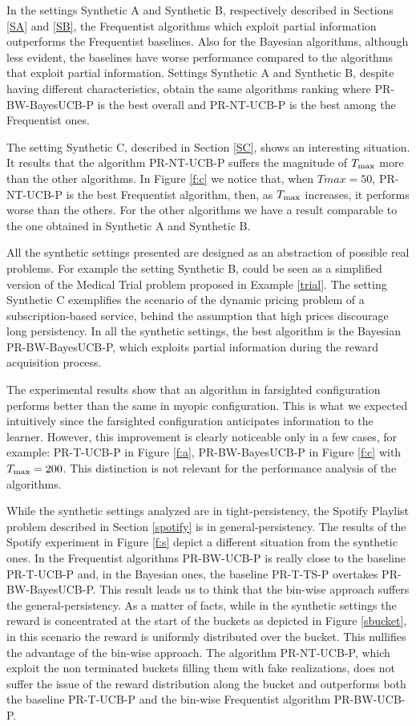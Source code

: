 In the settings Synthetic A and Synthetic B, respectively described in Sections \ref{SA} and \ref{SB}, the Frequentist algorithms which exploit partial information outperforms the Frequentist baselines. Also for the Bayesian algorithms, although less evident, the baselines have worse performance compared to the algorithms that exploit partial information. Settings Synthetic A and Synthetic B, despite having different characteristics, obtain the same algorithms ranking where PR-BW-BayesUCB-P is the best overall and PR-NT-UCB-P is the best among the Frequentist ones. 

The setting Synthetic C, described in Section \ref{SC}, shows an interesting situation. It results that the algorithm PR-NT-UCB-P suffers the magnitude of $T_{\textnormal{max}}$ more than the other algorithms. In Figure \ref{f:c} we notice that, when $Tmax=50$, PR-NT-UCB-P is the best Frequentist algorithm, then, as $T_{\textnormal{max}}$ increases, it performs worse than the others. For the other algorithms we have a result comparable to the one obtained in Synthetic A and Synthetic B.

All the synthetic settings presented are designed as an abstraction of possible real problems. For example the setting Synthetic B, could be seen as a simplified version of the Medical Trial problem proposed in Example \ref{trial}. The setting Synthetic C exemplifies the scenario of the dynamic pricing problem of a subscription-based service, behind the assumption that high prices discourage long persistency. In all the synthetic settings,  the best algorithm is the Bayesian PR-BW-BayesUCB-P, which exploits partial information during the reward acquisition process.

The experimental results show that an algorithm in farsighted configuration performs better than the same in myopic configuration. This is what we expected intuitively since the farsighted configuration anticipates information to the learner. However, this improvement is clearly noticeable only in a few cases, for example: PR-T-UCB-P in Figure \ref{f:a}, PR-BW-BayesUCB-P in Figure \ref{f:c} with $T_{\textnormal{max}}=200$. This distinction is not relevant for the performance analysis of the algorithms.

While the synthetic settings analyzed are in tight-persistency, the Spotify Playlist problem described in Section \ref{spotify} is in general-persistency. The results of the Spotify experiment in Figure \ref{f:s} depict a different situation from the synthetic ones. In the Frequentist algorithms PR-BW-UCB-P is really close to the baseline PR-T-UCB-P and, in the Bayesian ones, the baseline PR-T-TS-P overtakes PR-BW-BayesUCB-P. This result leads us to think that the bin-wise approach suffers the general-persistency. As a matter of facts, while in the synthetic settings the reward is concentrated at the start of the buckets as depicted in Figure \ref{sbucket}, in this scenario the reward is uniformly distributed over the bucket. This nullifies the advantage of the bin-wise approach. The algorithm PR-NT-UCB-P, which exploit the non terminated buckets filling them with fake realizations, does not suffer the issue of the reward distribution along the bucket and outperforms both the baseline PR-T-UCB-P and the bin-wise Frequentist algorithm PR-BW-UCB-P.

